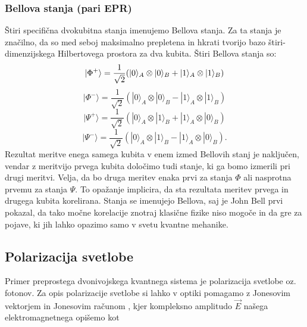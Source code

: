 \documentclass[12pt]{article}
\begin{document}
\subsubsection{Bellova stanja (pari EPR)}
Štiri specifična dvokubitna stanja imenujemo Bellova stanja. Za ta stanja je značilno, da so med seboj maksimalno prepletena in hkrati tvorijo bazo štiri-dimenzijskega Hilbertovega prostora za dva kubita. Štiri Bellova stanja so:
\begin{equation}
|\Phi ^{+}\rangle ={\frac  {1}{{\sqrt  {2}}}}(|0\rangle _{A}\otimes |0\rangle _{B}+|1\rangle _{A}\otimes |1\rangle _{B}) \\
\end{equation}
\begin{equation}
|\Phi ^{-}\rangle ={\frac  {1}{{\sqrt  {2}}}}(|0\rangle _{A}\otimes |0\rangle _{B}-|1\rangle _{A}\otimes |1\rangle _{B})
\end{equation}
\begin{equation}
|\Psi ^{+}\rangle ={\frac  {1}{{\sqrt  {2}}}}(|0\rangle _{A}\otimes |1\rangle _{B}+|1\rangle _{A}\otimes |0\rangle _{B})
\end{equation}
\begin{equation}
{\displaystyle |\Psi ^{-}\rangle ={\frac {1}{\sqrt {2}}}(|0\rangle _{A}\otimes |1\rangle _{B}-|1\rangle _{A}\otimes |0\rangle _{B})}.
\end{equation}
Rezultat meritve enega samega kubita v enem izmed Bellovih stanj je naključen, vendar z meritvijo prvega kubita določimo tudi stanje, ki ga bomo izmerili pri drugi meritvi. Velja, da bo druga meritev enaka prvi za stanja $\Phi$ ali nasprotna prvemu za stanja $\Psi$. To opažanje implicira, da sta rezultata meritev prvega in drugega kubita korelirana. Stanja se imenujejo Bellova, saj je John Bell prvi pokazal, da tako močne korelacije znotraj klasične fizike niso mogoče in da gre za pojave, ki jih lahko opazimo samo v svetu kvantne mehanike. \cite{BellState2023}

\subsection{Polarizacija svetlobe}

Primer preprostega dvonivojskega kvantnega sistema je polarizacija svetlobe oz. fotonov. Za opis polarizacije svetlobe si lahko v optiki pomagamo z Jonesovim vektorjem in Jonesovim računom \cite{JonesCalculus2023}, kjer kompleksno amplitudo $\vec{E}$ našega elektromagnetnega opišemo kot
\end{document}
